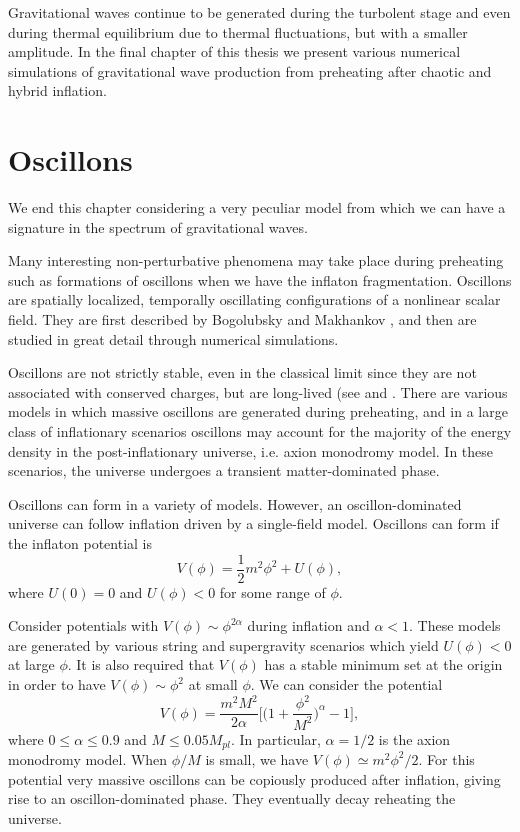 \documentclass[11pt,a4paper,twoside]{book}
\begin{document}
Gravitational waves continue to  be generated during the turbolent stage and even during thermal equilibrium due to thermal fluctuations, but with a smaller amplitude. In the final chapter of this thesis we present various numerical simulations of gravitational wave production from preheating after chaotic and hybrid inflation.


\section{Oscillons}
We end this chapter considering a very peculiar model from which we can have a signature in the spectrum of gravitational waves. 

Many interesting non-perturbative phenomena may take place during preheating such as formations of oscillons when we have the inflaton fragmentation. Oscillons are spatially localized, temporally oscillating configurations of a nonlinear scalar field. They are first described by Bogolubsky and Makhankov \cite{Chap5:Oscillon}, and then are studied in great detail through numerical simulations. 

Oscillons are not strictly stable, even in the classical limit since they are not associated  with conserved charges, but are long-lived (see \cite{Chap5:OscillonAfterInflation} and \cite{Chap5:Oscillon_OscillonFormationInThreeDimension}. There are various models in which massive oscillons are generated during preheating, and in a large class of inflationary scenarios oscillons may account for the majority of the energy density in the post-inflationary universe, i.e. axion monodromy model. In these scenarios, the universe undergoes a transient matter-dominated phase.

Oscillons can form in a variety of models. However, an oscillon-dominated universe  can follow inflation driven by a single-field model. Oscillons can form if the inflaton potential is
\begin{equation}
	\label{Chap5:Oscillons_Potential}
	V(\phi)=\frac{1}{2}m^{2}\phi^{2} + U(\phi),
\end{equation}
where $ U(0)=0 $ and $ U(\phi) < 0 $ for some range of $\phi$.

Consider potentials with $ V(\phi) \sim \phi^{2\alpha} $ during inflation and $\alpha < 1$. These models are generated by various string and supergravity scenarios which yield $ U(\phi) < 0  $ at large $\phi$. It is also required that $ V(\phi) $ has a stable minimum set at the origin in order to have $ V(\phi) \sim \phi^{2} $ at small $\phi$. We can consider the potential
\begin{equation}
\label{Chap5:OscillonsPotential}
V(\phi)=\frac{m^{2}M^{2}}{2\alpha}\Bigg[\Bigg(1+\frac{\phi^{2}}{M^{2}}\Bigg)^{\alpha} - 1\Bigg],
\end{equation}
where $ 0 \le \alpha \le 0.9$ and $ M \le 0.05 M_{pl} $. In particular, $\alpha = 1/2$ is the axion monodromy model. When $\phi/M$ is small, we have $ V(\phi) \simeq m^{2}\phi^{2}/2 $. For this potential very massive oscillons can be copiously produced after inflation, giving rise to an oscillon-dominated phase. They eventually decay reheating the universe.
\end{document}
